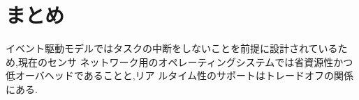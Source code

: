 \section{まとめ}


イベント駆動モデルではタスクの中断をしないことを前提に設計されているため,現在のセンサ
ネットワーク用のオペレーティングシステムでは省資源性かつ低オーバヘッドであることと,リア
ルタイム性のサポートはトレードオフの関係にある.






